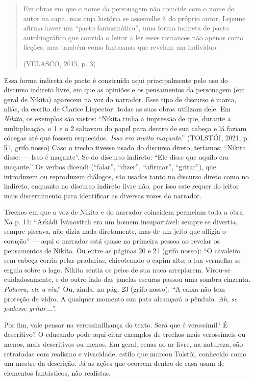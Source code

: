 \documentclass{article}
\begin{document}
\begin{enumerate}
\begin{quote}
Em obras em que o nome da personagem não coincide com o nome do autor na
capa, mas cuja história se assemelhe à do próprio autor, Lejeune afirma
haver um ``pacto fantasmático'', uma forma indireta de pacto
autobiográfico que convida o leitor a ler esses romances não apenas como
ficções, mas também como fantasmas que revelam um indivíduo.

(VELASCO, 2015, p. 3)
\end{quote}

Essa forma indireta de pacto é construída aqui principalmente pelo uso
do discurso indireto livre, em que as opiniões e os pensamentos da
personagem (em geral de Nikita) aparecem na voz do narrador. Esse tipo
de discurso é marca, aliás, da escrita de Clarice Lispector: todas as
suas obras utilizam dele. Em \emph{Nikita}, os exemplos são vastos:
``Nikita tinha a impressão de que, durante a multiplicação, o 1 e o 2
saltavam do papel para dentro de sua cabeça e lá faziam cócegas até que
fossem esquecidos\emph{. Isso era muito maçante}.'' (TOLSTÓI, 2021, p.
51, grifo nosso) Caso o trecho tivesse usado do discurso direto,
teríamos: ``Nikita disse: --- Isso é maçante''. Se do discurso indireto:
``Ele disse que aquilo era maçante.'' Os verbos dicendi (``falar'',
``dizer'', ``afirmar'', ``gritar''), que introduzem ou reproduzem
diálogos, são usados tanto no discurso direto como no indireto, enquanto
no discurso indireto livre não, por isso este requer do leitor mais
discernimento para identificar as diversas vozes do narrador.

Trechos em que a voz de Nikita e do narrador coincidem permeiam toda a
obra. Na p. 11: ``Arkádi Ivánovitch era um homem insuportável: sempre se
divertia, sempre piscava, não dizia nada diretamente, mas de um jeito
que afligia o coração'' --- aqui o narrador está quase na primeira
pessoa ao revelar os pensamentos de Nikita. Ou entre as páginas 20 e 21
(grifo nosso): ``O cavaleiro sem cabeça corria pelas pradarias,
chicoteando o capim alto; a lua vermelha se erguia sobre o lago. Nikita
sentia os pelos de sua nuca arrepiarem. Virou-se cuidadosamente, e do
outro lado das janelas escuras passou uma sombra cinzenta.
\emph{Palavra, ele a viu}.'' Ou, ainda, na pág. 23 (grifo nosso): ``A
caixa não tem proteção de vidro. A qualquer momento sua pata alcançará o
pêndulo. \emph{Ah, se pudesse gritar...''.}

Por fim, vale pensar na verossimilhança do texto. Será que é
verossímil? É descritivo? O educando pode aqui citar exemplos de trechos
mais verossímeis ou menos, mais descritivos ou menos. Em geral, cenas ao
ar livre, na natureza, são retratadas com realismo e vivacidade, estilo
que marcou Tolstói, conhecido como um mestre da descrição. Já as ações
que ocorrem dentro de casa usam de elementos fantásticos, não realistas.
\end{enumerate}
\end{document}

